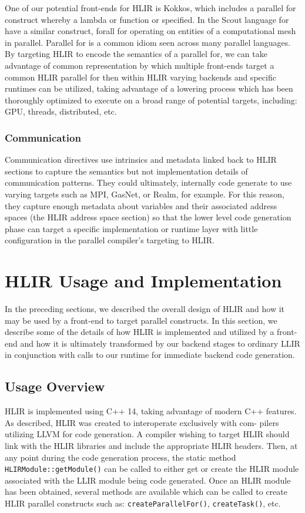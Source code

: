\documentclass[12pt]{article}
\begin{document}
One of our potential front-ends for HLIR is Kokkos, which includes a parallel for construct whereby a lambda or function or specified. In the Scout language for have a similar construct, forall for operating on entities of a computational mesh in parallel. Parallel for is a common idiom seen across many parallel languages. By targeting HLIR to encode the semantics of a parallel for, we can take advantage of common representation by which multiple front-ends target a common HLIR parallel for then within HLIR varying backends and specific runtimes can be utilized, taking advantage of a lowering process which has been thoroughly optimized to execute on a broad range of potential targets, including: GPU, threads, distributed, etc.

\subsubsection{Communication}

Communication directives use intrinsics and metadata linked back to HLIR sections to capture the semantics but not implementation details of communication patterns. They could ultimately, internally code generate to use varying targets such as MPI, GasNet, or Realm, for example. For this reason, they capture enough metadata about variables and their associated address spaces (the HLIR address space section) so that the lower level code generation phase can target a specific implementation or runtime layer with little configuration in the parallel compiler's targeting to HLIR.

\section{HLIR Usage and Implementation}

In the preceding sections, we described the overall design of HLIR and how it may be used by a front-end to target parallel constructs. In this section, we describe some of the details of how HLIR is implemented and utilized by a front-end and how it is ultimately transformed by our backend stages to ordinary LLIR in conjunction with calls to our runtime for immediate backend code generation.

\subsection{Usage Overview}

HLIR is implemented using C++ 14, taking advantage of modern C++ features. As described, HLIR was created to interoperate exclusively with com- pilers utilizing LLVM for code generation. A compiler wishing to target HLIR should link with the HLIR libraries and include the appropriate HLIR headers. Then, at any point during the code generation process, the static method {\tt HLIRModule::getModule()} can be called to either get or create the HLIR module associated with the LLIR module being code generated. Once an HLIR module has been obtained, several methods are available which can be called to create HLIR parallel constructs such as: {\tt createParallelFor()}, {\tt createTask()}, etc.
\end{document}
